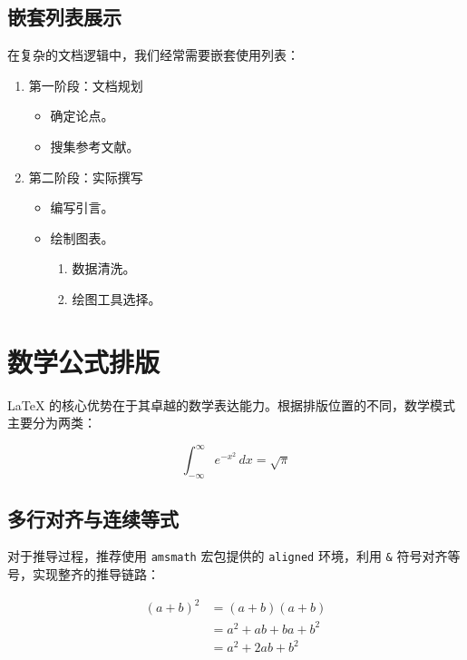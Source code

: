 \subsection{嵌套列表展示}
在复杂的文档逻辑中，我们经常需要嵌套使用列表：
\begin{enumerate}
  \item 第一阶段：文档规划
        \begin{itemize}
          \item 确定论点。
          \item 搜集参考文献。
        \end{itemize}
  \item 第二阶段：实际撰写
        \begin{itemize}
          \item 编写引言。
          \item 绘制图表。
                \begin{enumerate}
                  \item 数据清洗。
                  \item 绘图工具选择。
                \end{enumerate}
        \end{itemize}
\end{enumerate}

\section{数学公式排版}
\LaTeX{} 的核心优势在于其卓越的数学表达能力。根据排版位置的不同，数学模式主要分为两类：

\begin{equation}
  \int_{-\infty}^{\infty} e^{-x^2} \, dx = \sqrt{\pi}\label{eq:example_gauss}
\end{equation}

\subsection{多行对齐与连续等式}
对于推导过程，推荐使用 \texttt{amsmath} 宏包提供的 \texttt{aligned} 环境，利用 \texttt{\&} 符号对齐等号，实现整齐的推导链路：

\begin{equation}
  \begin{aligned}
    (a + b)^2 & = (a + b)(a + b)      \\
              & = a^2 + ab + ba + b^2 \\
              & = a^2 + 2ab + b^2
  \end{aligned}
\end{equation}

